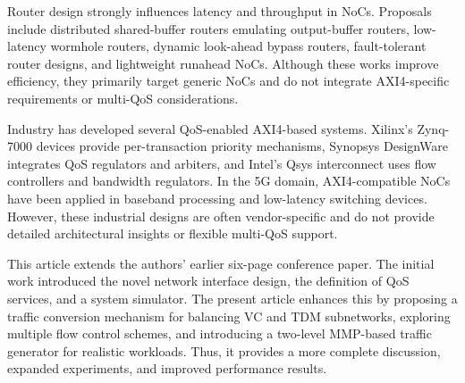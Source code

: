 Router design strongly influences latency and throughput in NoCs. Proposals include distributed shared-buffer routers emulating output-buffer routers, low-latency wormhole routers, dynamic look-ahead bypass routers, fault-tolerant router designs, and lightweight runahead NoCs. Although these works improve efficiency, they primarily target generic NoCs and do not integrate AXI4-specific requirements or multi-QoS considerations. 


Industry has developed several QoS-enabled AXI4-based systems. Xilinx’s Zynq-7000 devices provide per-transaction priority mechanisms, Synopsys DesignWare integrates QoS regulators and arbiters, and Intel’s Qsys interconnect uses flow controllers and bandwidth regulators. In the 5G domain, AXI4-compatible NoCs have been applied in baseband processing and low-latency switching devices. However, these industrial designs are often vendor-specific and do not provide detailed architectural insights or flexible multi-QoS support. 


This article extends the authors’ earlier six-page conference paper. The initial work introduced the novel network interface design, the definition of QoS services, and a system simulator. The present article enhances this by proposing a traffic conversion mechanism for balancing VC and TDM subnetworks, exploring multiple flow control schemes, and introducing a two-level MMP-based traffic generator for realistic workloads. Thus, it provides a more complete discussion, expanded experiments, and improved performance results. 


